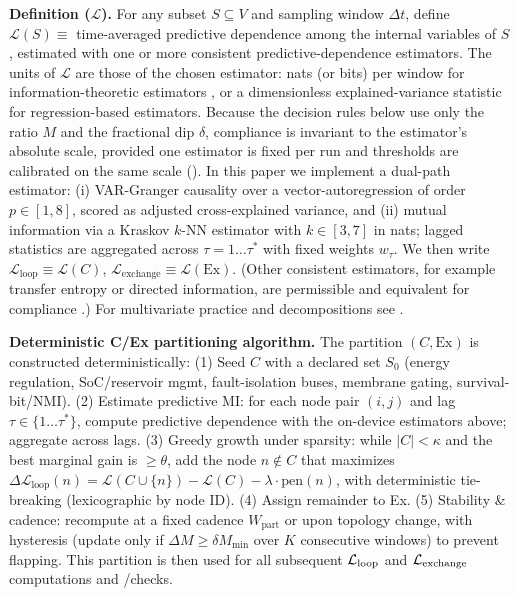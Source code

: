 \documentclass[11pt]{article}
\begin{document}
\textbf{Definition ($\mathcal{L}$).} For any subset $S \subseteq V$ and sampling window $\Delta t$, define $\mathcal{L}(S) \equiv$ time-averaged predictive dependence among the internal variables of $S$, estimated with one or more consistent predictive-dependence estimators. The units of $\mathcal{L}$ are those of the chosen estimator: nats (or bits) per window for information-theoretic estimators \cite{shannon1949mathematical,cover2006elements}, or a dimensionless explained-variance statistic for regression-based estimators. Because the decision rules below use only the ratio $M$ and the fractional dip $\delta$, compliance is invariant to the estimator's absolute scale, provided one estimator is fixed per run and thresholds are calibrated on the same scale (). In this paper we implement a dual-path estimator: (i) VAR-Granger causality \cite{granger1969investigating,lutkepohl2005new} over a vector-autoregression of order $p \in [1,8]$, scored as adjusted cross-explained variance, and (ii) mutual information via a Kraskov $k$-NN estimator with $k \in [3,7]$ \cite{kraskov2004estimating} in nats; lagged statistics are aggregated across $\tau = 1 \ldots \tau^*$ with fixed weights $w_\tau$. We then write $\mathcal{L}_{\text{loop}} \equiv \mathcal{L}(C)$, $\mathcal{L}_{\text{exchange}} \equiv \mathcal{L}(\text{Ex})$. (Other consistent estimators, for example transfer entropy or directed information, are permissible and equivalent for compliance \cite{schreiber2000measuring,massey1990causality}.) For multivariate practice and decompositions see \cite{geweke1982measurement,barnett2014mvgc}.

\textbf{Deterministic C/Ex partitioning algorithm.} The partition $(C, \text{Ex})$ is constructed deterministically: (1) Seed $C$ with a declared set $S_0$ (energy regulation, SoC/reservoir mgmt, fault-isolation buses, membrane gating, survival-bit/NMI). (2) Estimate predictive MI: for each node pair $(i,j)$ and lag $\tau \in \{1 \ldots \tau^*\}$, compute predictive dependence with the on-device estimators above; aggregate across lags. (3) Greedy growth under sparsity: while $|C| < \kappa$ and the best marginal gain is $\geq \theta$, add the node $n \notin C$ that maximizes $\Delta\mathcal{L}_{\text{loop}}(n) = \mathcal{L}(C \cup \{n\}) - \mathcal{L}(C) - \lambda \cdot \text{pen}(n)$, with deterministic tie-breaking (lexicographic by node ID). (4) Assign remainder to Ex. (5) Stability \& cadence: recompute at a fixed cadence $W_{\text{part}}$ or upon topology change, with hysteresis (update only if $\Delta M \geq \delta M_{\min}$ over $K$ consecutive windows) to prevent flapping. This partition is then used for all subsequent $\mathcal{L}_{\text{loop}}$ and $\mathcal{L}_{\text{exchange}}$ computations and \NC/\SC checks.
\end{document}
